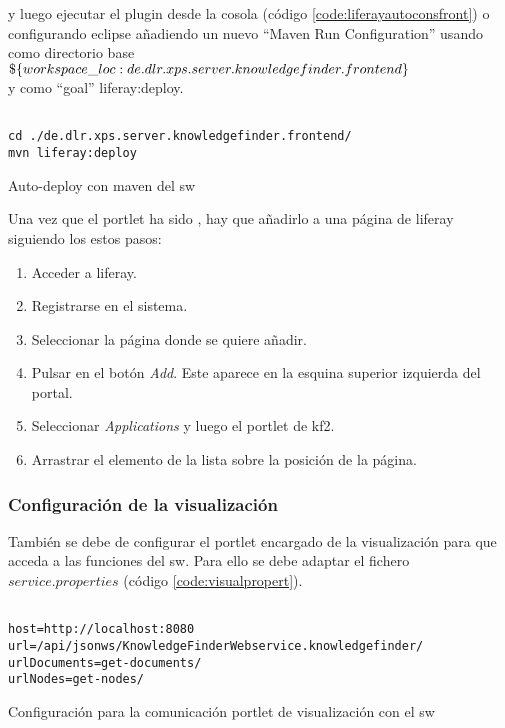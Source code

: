 y luego ejecutar el \gls{plugin} desde la cosola (código \ref{code:liferayautoconsfront}) o configurando \gls{eclipse} añadiendo un nuevo ``Maven Run Configuration'' usando como directorio base\\ 
$\$\{workspace\_loc:\/de.dlr.xps.server.knowledgefinder.frontend\}$\\
y como ``goal'' liferay:deploy.\\

\begin{listing}[H]
    \begin{verbatim}
               
cd ./de.dlr.xps.server.knowledgefinder.frontend/
mvn liferay:deploy
    \end{verbatim}
    \caption{Auto-\gls{deploy} con \gls{maven} del \gls{sw}}
    \label{code:liferayautoconsfront}
\end{listing}


Una vez que el \gls{portlet} ha sido , hay que añadirlo a una página de \gls{liferay} siguiendo los estos pasos:
\begin{enumerate}
	\item Acceder a \gls{liferay}.
	\item Registrarse en el sistema.
	\item Seleccionar la página donde se quiere añadir.
	\item Pulsar en el botón \textit{Add}. Este aparece en la esquina superior izquierda del portal.
	\item Seleccionar \textit{Applications} y luego el portlet de \gls{kf2}.
	\item Arrastrar el elemento de la lista sobre la posición de la página.
\end{enumerate}


\subsubsection{Configuración de la visualización}

También se debe de configurar el \gls{portlet} encargado de la visualización  para que acceda a las funciones del \gls{sw}. Para ello se debe adaptar el fichero $service.properties$ (código \ref{code:visualpropert}).

\begin{listing}[H]
    \begin{verbatim}

host=http://localhost:8080
url=/api/jsonws/KnowledgeFinderWebservice.knowledgefinder/
urlDocuments=get-documents/
urlNodes=get-nodes/
    \end{verbatim}
    \caption{Configuración para la comunicación \gls{portlet} de visualización con el \gls{sw}}
    \label{code:visualpropert}
\end{listing}


